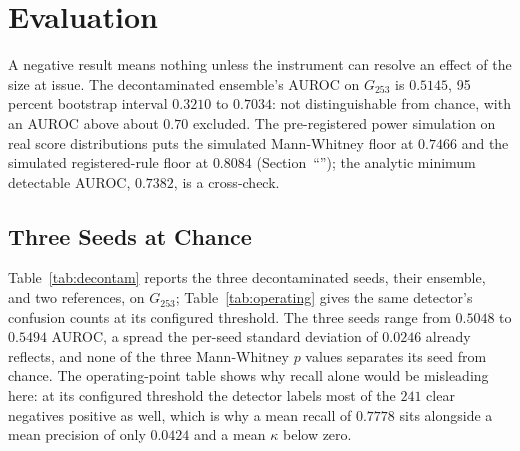 \section{Evaluation}
\label{sec:res-rq4}

A negative result means nothing unless the instrument can resolve an effect of the size at
issue. The decontaminated
ensemble's AUROC on $G_{253}$ is $0.5145$, 95 percent bootstrap interval
$0.3210$ to $0.7034$: not distinguishable from chance, with an AUROC above
about $0.70$ excluded. The pre-registered power simulation on real score distributions
puts the simulated Mann-Whitney floor at $0.7466$ and the simulated
registered-rule floor at $0.8084$
(Section~``''); the analytic
minimum detectable AUROC, $0.7382$, is a cross-check.

\subsection{Three Seeds at Chance}

Table~\ref{tab:decontam} reports the three decontaminated seeds, their ensemble, and two
references, on $G_{253}$; Table~\ref{tab:operating} gives the same detector's confusion counts
at its configured threshold. The three seeds range from $0.5048$ to $0.5494$ AUROC, a spread the
per-seed standard deviation of $0.0246$ already reflects, and none of the three Mann-Whitney $p$
values separates its seed from chance. The operating-point table shows why recall alone would
be misleading here: at its configured threshold the detector labels most of the
$241$ clear negatives positive as well, which is why a mean recall of $0.7778$ sits alongside a
mean precision of only $0.0424$ and a mean $\kappa$ below zero.

